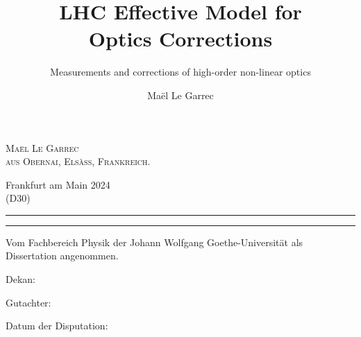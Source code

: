 {{{            \scshape{Maël Le Garrec}\normalfont\subtitlefont\fontsize{11pt}{\fontskipsecondtitle}\selectfont\\
            aus Obernai, Elsàss, Frankreich.
        }
        \vfill
        \begin{center}
            Frankfurt am Main 2024\\
            (D30)
        \end{center}

        \noindent\rule[0.5em]{\textwidth}{1.5pt}\vspace{-20pt}
        \noindent\rule[0.5em]{\textwidth}{1.5pt}
    }
    \makeatother
    
    \title{LHC Effective Model for\\Optics Corrections}
    \subtitle{Measurements and corrections of high-order non-linear optics}
    \author{Maël Le Garrec}

    \cleardoublepage
    \makesecondtitle
}


{
    \makeatletter
    \def\makethirdtitle{%
        \thispagestyle{empty} %
        \normalfont\subtitlefont\fontsize{11pt}{15pt}\selectfont%
        
        \begin{flushleft}
            Vom Fachbereich Physik der Johann Wolfgang Goethe-Universität als Dissertation angenommen.
        \end{flushleft}
        \vspace{\vspacesignatures}
        \vspace{\vspacesignatures}

        \noindent Dekan:

        \vspace{\vspacesignatures}
        \noindent Gutachter:

        \vspace{\vspacesignatures}
        \noindent Datum der Disputation:
    }
    \makeatother
    
    \clearpage
    \makethirdtitle
}
